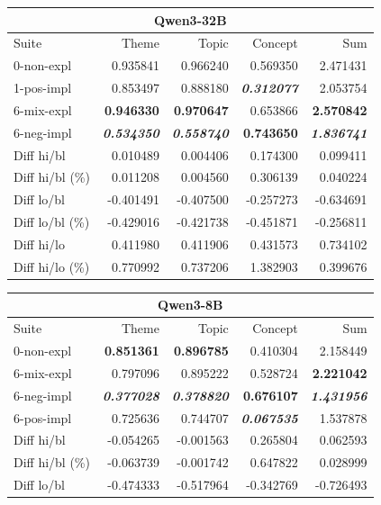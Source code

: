 \begin{table}
    \begin{tabular}{lrrrr}
    \toprule
    \multicolumn{5}{c}{\textbf{Qwen3-32B}} \\
    \midrule
    Suite & Theme & Topic & Concept & Sum \\
    \midrule
    0-non-expl & 0.935841 & 0.966240 & 0.569350 & 2.471431 \\
    1-pos-impl & 0.853497 & 0.888180 & \bfseries \itshape 0.312077 & 2.053754 \\
    6-mix-expl & \bfseries 0.946330 & \bfseries 0.970647 & 0.653866 & \bfseries 2.570842 \\
    6-neg-impl & \bfseries \itshape 0.534350 & \bfseries \itshape 0.558740 & \bfseries 0.743650 & \bfseries \itshape 1.836741 \\
    \midrule
    Diff hi/bl & 0.010489 & 0.004406 & 0.174300 & 0.099411 \\
    Diff hi/bl (\%) & 0.011208 & 0.004560 & 0.306139 & 0.040224 \\
    \midrule
    Diff lo/bl & -0.401491 & -0.407500 & -0.257273 & -0.634691 \\
    Diff lo/bl (\%) & -0.429016 & -0.421738 & -0.451871 & -0.256811 \\
    \midrule
    Diff hi/lo & 0.411980 & 0.411906 & 0.431573 & 0.734102 \\
    Diff hi/lo (\%) & 0.770992 & 0.737206 & 1.382903 & 0.399676 \\
    \bottomrule
    \end{tabular}
    \begin{tabular}{lrrrr}
    \toprule
    \multicolumn{5}{c}{\textbf{Qwen3-8B}} \\
    \midrule
    Suite & Theme & Topic & Concept & Sum \\
    \midrule
    0-non-expl & \bfseries 0.851361 & \bfseries 0.896785 & 0.410304 & 2.158449 \\
    6-mix-expl & 0.797096 & 0.895222 & 0.528724 & \bfseries 2.221042 \\
    6-neg-impl & \bfseries \itshape 0.377028 & \bfseries \itshape 0.378820 & \bfseries 0.676107 & \bfseries \itshape 1.431956 \\
    6-pos-impl & 0.725636 & 0.744707 & \bfseries \itshape 0.067535 & 1.537878 \\
    \midrule
    Diff hi/bl & -0.054265 & -0.001563 & 0.265804 & 0.062593 \\
    Diff hi/bl (\%) & -0.063739 & -0.001742 & 0.647822 & 0.028999 \\
    \midrule
    Diff lo/bl & -0.474333 & -0.517964 & -0.342769 & -0.726493 \\

\end{tabular}
\end{table}
